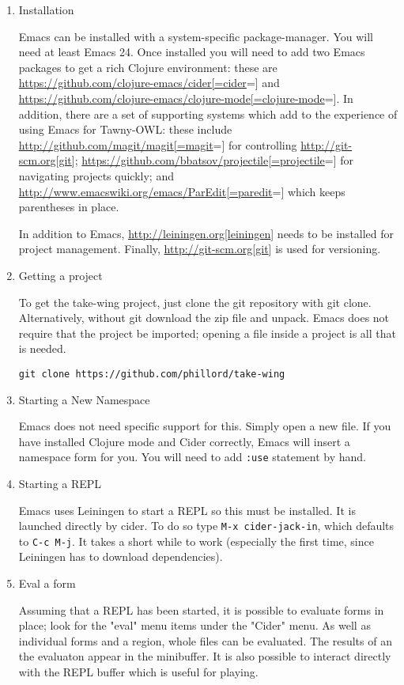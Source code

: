 \documentclass[11pt]{article}
\begin{document}
\begin{enumerate}
\item Installation
\label{sec-6-1-1-1}

Emacs can be installed with a system-specific package-manager. You will
need at least Emacs 24. Once installed you will need to add two Emacs
packages to get a rich Clojure environment: these are
\url{https://github.com/clojure-emacs/cider[=cider}=] and
\url{https://github.com/clojure-emacs/clojure-mode[=clojure-mode}=]. In
addition, there are a set of supporting systems which add to the
experience of using Emacs for Tawny-OWL: these include
\url{http://github.com/magit/magit[=magit}=] for controlling
\url{http://git-scm.org[git}];
\url{https://github.com/bbatsov/projectile[=projectile}=] for navigating
projects quickly; and \url{http://www.emacswiki.org/emacs/ParEdit[=paredit}=]
which keeps parentheses in place.

In addition to Emacs, \url{http://leiningen.org[leiningen}] needs to be
installed for project management. Finally, \url{http://git-scm.org[git}] is
used for versioning.

\item Getting a project
\label{sec-6-1-1-2}

To get the take-wing project, just clone the git repository with git
clone. Alternatively, without git download the zip file and unpack.
Emacs does not require that the project be imported; opening a file
inside a project is all that is needed.

\begin{verbatim}
git clone https://github.com/phillord/take-wing
\end{verbatim}


\item Starting a New Namespace
\label{sec-6-1-1-3}

Emacs does not need specific support for this. Simply open a new file.
If you have installed Clojure mode and Cider correctly, Emacs will
insert a namespace form for you. You will need to add \texttt{:use} statement
by hand.

\item Starting a REPL
\label{sec-6-1-1-4}

Emacs uses Leiningen to start a REPL so this must be installed. It is
launched directly by cider. To do so type \texttt{M-x cider-jack-in}, which
defaults to \texttt{C-c M-j}. It takes a short while to work (especially the
first time, since Leiningen has to download dependencies).

\item Eval a form
\label{sec-6-1-1-5}

Assuming that a REPL has been started, it is possible to evaluate forms
in place; look for the "eval" menu items under the "Cider" menu. As well
as individual forms and a region, whole files can be evaluated. The
results of an the evaluaton appear in the minibuffer. It is also
possible to interact directly with the REPL buffer which is useful for
playing.
\end{enumerate}
\end{document}
